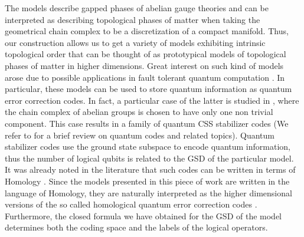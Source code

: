 \documentclass[titlepage,11pt]{article}
\theoremstyle{plain}%
\theoremstyle{definition}
\theoremstyle{remark}
\begin{document}
The models describe gapped phases of abelian gauge theories and can be interpreted as describing topological phases of matter \cite{Wen04,Sarma08,Anderson87} when taking the geometrical chain complex to be a discretization of a compact manifold. Thus, our construction allows us to get a variety of models exhibiting intrinsic topological order \cite{Wen89,Wen90,LevinWen} that can be thought of as prototypical models of topological phases of matter in higher dimensions. Great interest on such kind of models arose due to possible applications in fault tolerant quantum computation \cite{Kitaev2,Nayak08,Freedman03}. In particular, these models can be used to store quantum information as quantum error correction codes. In fact, a particular case of the latter is studied in \cite{Hastings}, where the chain complex of abelian groups is chosen to have only one non trivial component. This case results in a family of quantum CSS stabilizer codes \cite{CalderbankCSS} (We refer to \cite{Devitt} for a brief review on quantum codes and related topics). Quantum stabilizer codes use the ground state subspace to encode quantum information, thus the number of logical qubits is related to the GSD of the particular model. It was already noted in the literature that such codes can be written in terms of Homology \cite{Bombin07,Bombin13,Bravyi14}. Since the models presented in this piece of work are written in the language of Homology, they are naturally interpreted as the higher dimensional versions of the so called homological quantum error correction codes \cite{Bravyi98,Vrana15,Anderson13hom}. Furthermore, the closed formula we have obtained for the GSD of the model determines both the coding space and the labels of the logical operators.
\end{document}
